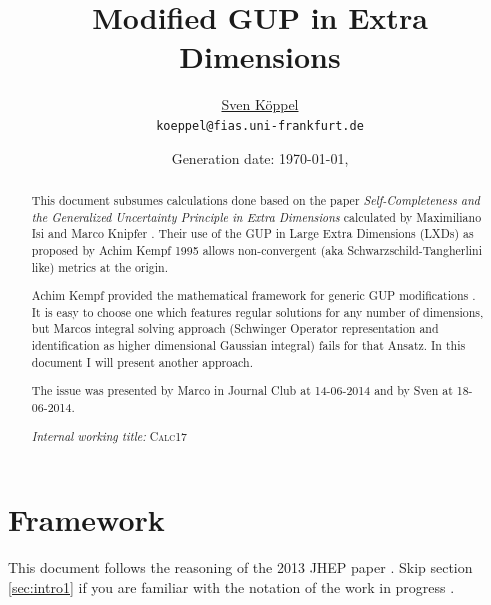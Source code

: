 \documentclass[10pt,a4paper]{article}
\title{Modified GUP in Extra Dimensions}
\author{\href{https://itp.uni-frankfurt.de/~koeppel}{Sven Köppel} \\
\texttt{koeppel@fias.uni-frankfurt.de}}
\date{Generation date: \today, \currenttime}
\begin{document}
\maketitle

\renewcommand{\d}{\mathrm{d}}
\newcommand{\dd}[2]{\frac{\mathrm{d} #1}{\mathrm{d} #2}}
\newcommand{\pp}[2]{\frac{\partial #1}{\partial #2}}
\newcommand{\dann}{$\rightarrow~$}
\newcommand{\CA}{ {\cal A}}
\newcommand{\C}[1]{ {\cal #1} }
\newcommand{\mn}{_{\mu\nu}}
\newcommand{\bv}[1]{ \mathbf{ #1 } } %

\newcommand*{\mathcolor}{}
\def\mathcolor#1#{\mathcoloraux{#1}}
\newcommand*{\mathcoloraux}[3]{%
  \protect\leavevmode
  \begingroup
    \color#1{#2}#3%
  \endgroup
}
\newcommand{\redmin}{\mathcolor{red}{-}}
\newcommand{\redplus}{\mathcolor{red}{+}}
\newcommand{\pn}{\mathcolor{OliveGreen}{+ n}}
\newcommand{\n}{ {\mathcolor{OliveGreen}{n}} }

\begin{abstract}
This document subsumes calculations done based on the
paper \textit{Self-Completeness and the Generalized
Uncertainty Principle in Extra Dimensions} calculated by
Maximiliano Isi and Marco Knipfer \cite{work}. Their use of the GUP
in Large Extra Dimensions (LXDs) as proposed by Achim
Kempf 1995 allows non-convergent (aka Schwarzschild-Tangherlini like)
metrics at the origin.

Achim Kempf provided the mathematical framework for generic
GUP modifications \cite{kempf1995}. It is easy to choose one which features
regular solutions for any number of dimensions, but Marcos
integral solving approach (Schwinger Operator representation and identification as higher dimensional Gaussian integral) fails for that Ansatz. In this
document I will present another approach.

The issue was presented by Marco in Journal Club at 14-06-2014
and by Sven at 18-06-2014.

\hfill\textit{Internal working title:} \textsc{Calc17}
\end{abstract}


\tableofcontents


\newpage

\section{Framework}
This document follows the reasoning of the 2013 JHEP paper \cite{isi2013}. Skip section \ref{sec:intro1} if you are familiar with the notation of the work in progress \cite{work}.
\end{document}

